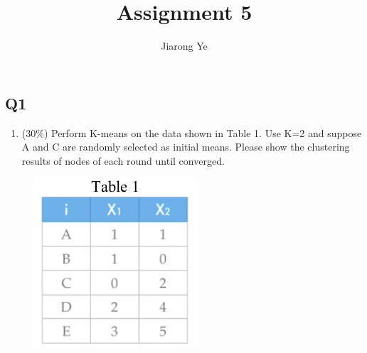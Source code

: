 \documentclass[11pt]{article}
\title{Assignment 5}
\author{Jiarong Ye}
\makeatletter
\def\maxwidth{\ifdim\Gin@nat@width>\linewidth\linewidth
    \else\Gin@nat@width\fi}
\let\Oldincludegraphics\includegraphics
\renewcommand{\includegraphics}[1]{\Oldincludegraphics[width=.8\maxwidth]{#1}}
\providecommand{\tightlist}{%
      \setlength{\itemsep}{0pt}\setlength{\parskip}{0pt}}
\makeatother
\begin{document}
    
    
    \maketitle
    
    

    
    \subsection*{Q1}\label{q1}

\begin{enumerate}
\def\labelenumi{\arabic{enumi}.}
\tightlist
\item
  (30\%) Perform K-means on the data shown in Table 1. Use K=2 and
  suppose A and C are randomly selected as initial means. Please show
  the clustering results of nodes of each round until converged.
\end{enumerate}

\begin{figure}[H]
\centering
\includegraphics{1.png}
\caption{}
\end{figure}
\end{document}
